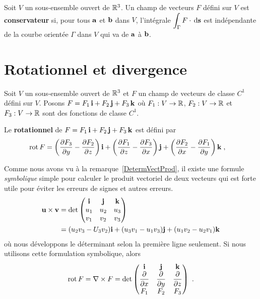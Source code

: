 {\begin{focus}{\dfn} 
Soit $V$ un sous-ensemble ouvert de $\mathbb{R}^3$.  Un champ de vecteurs
$F$ défini sur $V$ est {\bfseries  conservateur} si, pour tous
$\mathbf{a}$ et $\mathbf{b}$ dans $V$, l'intégrale
$\displaystyle \int_\Gamma F \cdot \,\mathrm{d}\mathbf{s}$ est
indépendante de la courbe orientée $\Gamma$ dans $V$ qui va de
$\mathbf{a}$ à $\mathbf{b}$.
\end{focus}

\section{Rotationnel et divergence}

Soit $V$ un sous-ensemble ouvert de $\mathbb{R}^3$ et $F$ un champ de
vecteurs de classe $C^1$ défini sur $V$.  Posons
$F = F_1\,\mathbf{i} + F_2\,\mathbf{j} + F_3\,\mathbf{k}$ où $F_1:V\rightarrow \mathbb{R}$,
$F_2:V\rightarrow \mathbb{R}$ et $F_3:V\rightarrow \mathbb{R}$ sont des fonctions de
classe $C^1$.

\begin{focus}{\dfn} 
Le {\bfseries rotationnel} de $F = F_1\,\mathbf{i} + F_2\,\mathbf{j} + F_3\,\mathbf{k}$
est défini par
\begin{equation*}
\begin{split}
\operatorname{rot} F & = \left( \frac{\partial F_3}{\partial y} - \frac{\partial F_2}{\partial z} \right) \mathbf{i} +
\left( \frac{\partial F_1}{\partial z} - \frac{\partial F_3}{\partial x} \right) \mathbf{j} +
\left( \frac{\partial F_2}{\partial x}- \frac{\partial F_1}{\partial y} \right) \mathbf{k} \; ,
\end{split}
\end{equation*}
\end{focus}

\begin{rmk}
Comme nous avons vu à la remarque~\ref{DetermVectProd}, il existe une formule
{\em symbolique} simple pour calculer le produit vectoriel de deux
vecteurs qui est forte utile pour éviter les erreurs de signes et
autres erreurs.
\begin{align*}
\mathbf{u} \times \mathbf{v} &= \det \begin{pmatrix}
\mathbf{i} & \mathbf{j} & \mathbf{k} \\
u_1 & u_2 & u_3 \\
v_1 & v_2 & v_3 \end{pmatrix} \\
&= (u_2 v_3 - U_3v_2)\mathbf{i} + (u_3 v_1 - u_1 v_3) \mathbf{j}
+ (u_1v_2 - u_2v_1) \mathbf{k}
\end{align*}
où nous développons le déterminant selon la première ligne seulement.
Si nous utilisons cette formulation symbolique, alors
\[
\operatorname{rot} F
= \nabla \times F
= \det \begin{pmatrix}
\mathbf{i} & \mathbf{j} & \mathbf{k} \\
\displaystyle \frac{\partial }{\partial x} & \displaystyle \frac{\partial }{\partial y} &
\displaystyle \frac{\partial }{\partial z} \\
F_1 & F_2 & F_3
\end{pmatrix} \ .
\]
\end{rmk}

}

